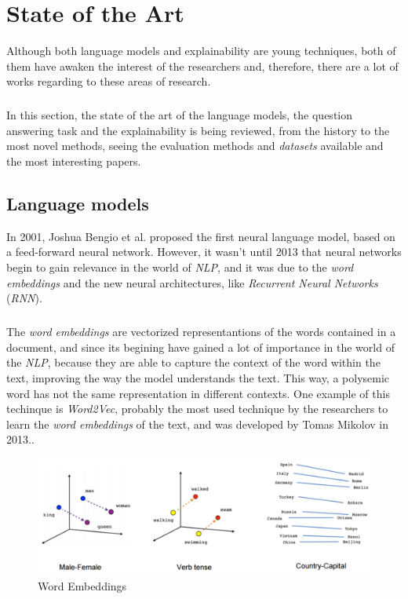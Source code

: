 
\chapter{State of the Art}
\label{ch:StateOfTheArt}
\noindent Although both language models and explainability are young techniques, both of them have awaken the interest of the researchers and, therefore, there are a lot of works regarding to these areas of research.
\paragraph{}
In this section, the state of the art of the language models, the question answering task and the explainability is being reviewed, from the history to the most novel methods, seeing the evaluation methods and \emph{datasets} available and the most interesting papers.
\section{Language models}
\label{sec:LanguageModels}
\noindent In 2001, Joshua Bengio et al. proposed the first neural language model, based on a feed-forward neural network.\cite{Bengio2001} However, it wasn't until 2013 that neural networks begin to gain relevance in the world of \emph{NLP}, and it was due to the \emph{word embeddings} and the new neural architectures, like \emph{Recurrent Neural Networks} (\emph{RNN}).
\paragraph{}
The \emph{word embeddings} are vectorized representantions of the words contained in a document, and since its begining have gained a lot of importance in the world of the \emph{NLP}, because they are able to capture the context of the word within the text, improving the way the model understands the text. This way, a polysemic word has not the same representation in different contexts. One example of this techinque is \emph{Word2Vec}, probably the most used technique by the researchers to learn the \emph{word embeddings} of the text, and was developed by Tomas Mikolov in 2013.\cite{Mikolov2013}.
\begin{figure}[h!]
	\centering
	\includegraphics[scale=0.35]{images/wordembeddings}
	\caption{Word Embeddings}
	\label{fig:wordembdedding}
\end{figure}
